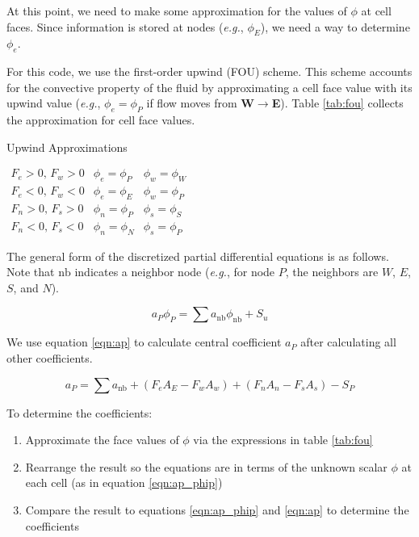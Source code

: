 \documentclass{article}
\newcommand{\lp}{\left(}
\newcommand{\rp}{\right)}
\begin{document}
At this point, we need to make some approximation for the values of $\phi$ at cell faces. Since information is stored at nodes (\textit{e.g.}, $\phi_E$), we need a way to determine $\phi_e$.

For this code, we use the first-order upwind (FOU) scheme. This scheme accounts for the convective property of the fluid by approximating a cell face value with its upwind value (\textit{e.g.}, $\phi_e = \phi_P$ if flow moves from \textbf{W}$\rightarrow$\textbf{E}). Table \ref{tab:fou} collects the approximation for cell face values. 

\begin{table}[!ht]
\caption{Upwind Approximations}
\centering
$\begin{array}{lcc} \hline
     F_e > 0,\, F_w > 0 & \phi_e = \phi_P & \phi_w = \phi_W \\
     F_e < 0,\, F_w < 0 & \phi_e = \phi_E & \phi_w = \phi_P \\
     F_n > 0,\, F_s > 0 & \phi_n = \phi_P & \phi_s = \phi_S \\
     F_n < 0,\, F_s < 0 & \phi_n = \phi_N & \phi_s = \phi_P 
\end{array}$
\label{tab:fou}
\end{table}

The general form of the discretized partial differential equations is as follows. Note that $\mathrm{nb}$ indicates a neighbor node (\textit{e.g.}, for node $P$, the neighbors are $W$, $E$, $S$, and $N$). 

\begin{equation}
   a_P \phi_P = \sum a_{\mathrm{nb}} \phi_{\mathrm{nb}} + S_u
   \label{eqn:ap_phip}
\end{equation}

We use equation \ref{eqn:ap} to calculate central coefficient $a_P$ after calculating all other coefficients.

\begin{equation}
   a_P = \sum a_{\mathrm{nb}} + \lp F_e A_E - F_w A_w \rp + \lp F_n A_n - F_s A_s \rp - S_P
   \label{eqn:ap}
\end{equation}

To determine the coefficients:
\begin{enumerate}
    \item Approximate the face values of $\phi$ via the expressions in table \ref{tab:fou}
    \item Rearrange the result so the equations are in terms of the unknown scalar $\phi$ at each cell (as in equation \ref{eqn:ap_phip})
    \item Compare the result to equations \ref{eqn:ap_phip} and \ref{eqn:ap} to determine the coefficients
\end{enumerate}
\end{document}
